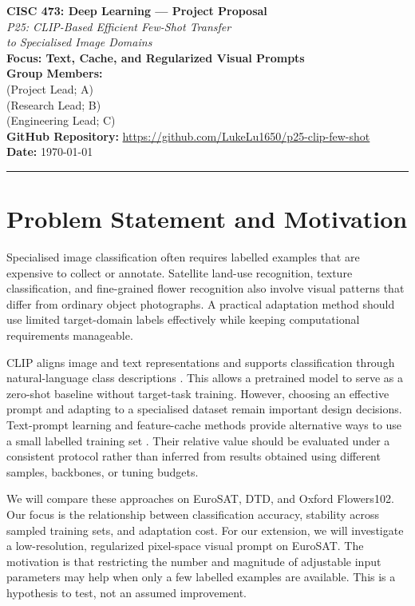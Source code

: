 \documentclass[11pt,letterpaper]{article}
\newcommand{\memberA}{[Student 1 Name]}
\newcommand{\memberB}{[Student 2 Name]}
\newcommand{\memberC}{[Student 3 Name]}
\newcommand{\studentIDA}{[Student 1 ID]}
\newcommand{\studentIDB}{[Student 2 ID]}
\newcommand{\studentIDC}{[Student 3 ID]}
\begin{document}
{\centering
  {\Large\textbf{CISC 473: Deep Learning --- Project Proposal}}\\[0.5em]
  {\large\textit{P25: CLIP-Based Efficient Few-Shot Transfer\\
  to Specialised Image Domains}}\\[0.4em]
  \textbf{Focus: Text, Cache, and Regularized Visual Prompts}\\[0.5em]
  \textbf{Group Members:}\\
  \memberA\quad\studentIDA\quad (Project Lead; A)\\
  \memberB\quad\studentIDB\quad (Research Lead; B)\\
  \memberC\quad\studentIDC\quad (Engineering Lead; C)\\[0.3em]
  \textbf{GitHub Repository:} \url{https://github.com/LukeLu1650/p25-clip-few-shot}\\[0.3em]
  \textbf{Date:} \today\\[0.4em]
  \rule{\linewidth}{0.4pt}\par
}

\section{Problem Statement and Motivation}

Specialised image classification often requires labelled examples that are expensive to collect or annotate. Satellite land-use recognition, texture classification, and fine-grained flower recognition also involve visual patterns that differ from ordinary object photographs. A practical adaptation method should use limited target-domain labels effectively while keeping computational requirements manageable.

CLIP aligns image and text representations and supports classification through natural-language class descriptions \cite{clip}. This allows a pretrained model to serve as a zero-shot baseline without target-task training. However, choosing an effective prompt and adapting to a specialised dataset remain important design decisions. Text-prompt learning and feature-cache methods provide alternative ways to use a small labelled training set \cite{coop,tip}. Their relative value should be evaluated under a consistent protocol rather than inferred from results obtained using different samples, backbones, or tuning budgets.

We will compare these approaches on EuroSAT, DTD, and Oxford Flowers102. Our focus is the relationship between classification accuracy, stability across sampled training sets, and adaptation cost. For our extension, we will investigate a low-resolution, regularized pixel-space visual prompt on EuroSAT. The motivation is that restricting the number and magnitude of adjustable input parameters may help when only a few labelled examples are available. This is a hypothesis to test, not an assumed improvement.
\end{document}
